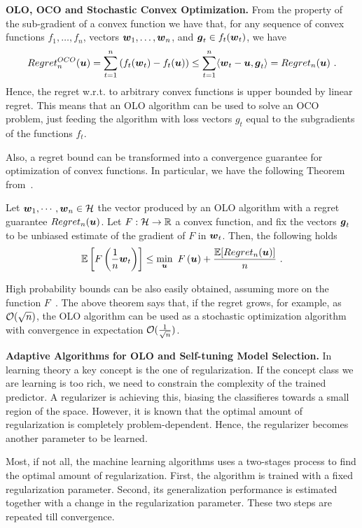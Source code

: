 \vspace{0.2cm}\noindent\textbf{\ac{OLO}, \ac{OCO} and Stochastic Convex Optimization.}
From the property of the sub-gradient of a convex function we have that, for any sequence of convex functions $f_1, \ldots, f_n$, vectors $\boldsymbol{w}_1,\ldots, \boldsymbol{w}_n$, and $\boldsymbol{g}_t \in f_t(\boldsymbol{w}_t)$, we have
\[
Regret^{OCO}_n(\boldsymbol{u}) = \sum_{t=1}^n \left( f_t(\boldsymbol{w}_t) -f_t(\boldsymbol{u})\right) \leq \sum_{t=1}^n \langle \boldsymbol{w}_t-\boldsymbol{u}, \boldsymbol{g}_t\rangle = Regret_n(\boldsymbol{u})~.
\]
Hence, the regret w.r.t. to arbitrary convex functions is upper bounded by linear regret. This means that an \ac{OLO} algorithm can be used to solve an \ac{OCO} problem, just feeding the algorithm with loss vectors $g_t$ equal to the subgradients of the functions $f_t$.

Also, a regret bound can be transformed into a convergence guarantee for optimization of convex functions.
In particular, we have the following Theorem from~\citet{Cesa-BianchiCG04}.
%
\begin{theorem}
\label{theo:online_to_batch}
Let $\boldsymbol{w}_1, \cdots, \boldsymbol{w}_n \in \mathcal{H}$ the vector produced by an OLO algorithm with a regret guarantee $Regret_n(\boldsymbol{u})$.
Let $F:\mathcal{H}\rightarrow\mathbb{R}$ a convex function, and fix the vectors $\boldsymbol{g}_t$ to be unbiased estimate of the gradient of $F$ in $\boldsymbol{w}_t$. Then, the following holds
\[
\mathbb{E}\left[F\left(\frac{1}{n} \boldsymbol{w}_t\right)\right] \leq \min_{\boldsymbol{u}} \ F\left(\boldsymbol{u}\right) + \frac{\mathbb{E}[Regret_n(\boldsymbol{u})]}{n}~.
\]
\end{theorem}

High probability bounds can be also easily obtained, assuming more on the function $F$~\citep{Cesa-BianchiCG04}.
The above theorem says that, if the regret grows, for example, as $\mathcal{O}(\sqrt{n})$, the OLO algorithm can be used as a stochastic optimization algorithm with convergence in expectation $\mathcal{O}(\frac{1}{\sqrt{n}})$.


\vspace{0.2cm}\noindent\textbf{Adaptive Algorithms for OLO and Self-tuning Model Selection.}
In learning theory a key concept is the one of regularization. If the concept class we are learning is too rich, we need to constrain the complexity of the trained predictor. A regularizer is achieving this, biasing the classifieres towards a small region of the space. However, it is known that the optimal amount of regularization is completely problem-dependent. Hence, the regularizer becomes another parameter to be learned.

Most, if not all, the machine learning algorithms uses a two-stages process to find the optimal amount of regularization. First, the algorithm is trained with a fixed regularization parameter. Second, its generalization performance is estimated together with a change in the regularization parameter. These two steps are repeated till convergence.

